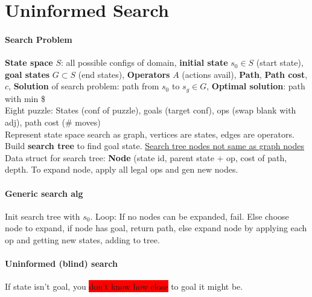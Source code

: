 \color[HTML]{11114E}
\section{Uninformed Search}
\paragraph{Search Problem} \textbf{State space} $S$: all possible configs of
domain, \textbf{initial state} $s_0 \in S$ (start state), \textbf{goal
states} $G \subset S$ (end states), \textbf{Operators} $A$ (actions
avail), \textbf{Path}, \textbf{Path cost}, $c$, \textbf{Solution} of
search problem: path from $s_0$ to $s_g\in G$, \textbf{Optimal
  solution}: path with min \$
\\ Eight puzzle: States (conf of puzzle), goals (target conf), ops
(swap blank with adj), path cost (\# moves)
\\ Represent state space search as graph, vertices are states, edges
are operators. Build \textbf{search tree} to find goal
state. \underline{Search tree nodes not same as graph nodes}
\\ Data struct for search tree: \textbf{Node} (state id, parent state
+ op, cost of path, depth. To expand node, apply all legal ops and gen
new nodes.
\paragraph{Generic search alg} Init search tree with $s_0$. Loop: If
no nodes can be expanded, fail. Else choose node to expand, if node
has goal, return path, else expand node by applying each op and
getting new states, adding to tree.
\paragraph{Uninformed (blind) search} If state isn't goal, you \colorbox{red}{don't
know how close} to goal it might be.
